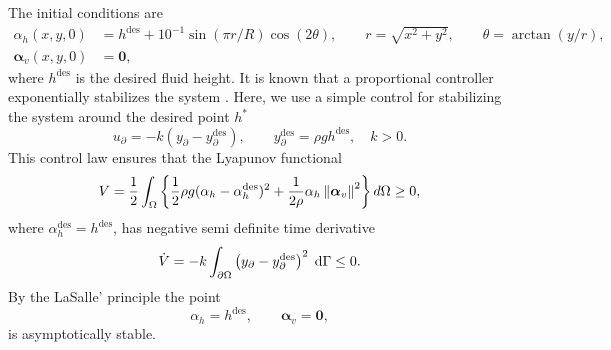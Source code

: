  The initial conditions are
\begin{equation}
\begin{aligned}
\alpha_h(x, y, 0) &= h^{\text{des}} + 10^{-1} \sin(\pi r/R) \cos(2 \theta), \qquad r = \sqrt{x^2 + y^2}, \qquad \theta = \arctan(y/r), \\
\bm\alpha_v(x, y, 0) &= \bm{0},
\end{aligned}
\end{equation}
where $ h^{\text{des}}$ is the desired fluid height. It is known that a proportional controller exponentially stabilizes the system \cite{dos2008boundary}. Here, we use a simple control for stabilizing the system around the desired point $h^*$
\begin{equation}\label{eq:ctrllaw_SWE}
u_\partial = -k (y_\partial - y_\partial^{\text{des}}), \qquad y_\partial^{\text{des}}= \rho g h^{\text{des}}, \quad k>0.
\end{equation}
This control law ensures that the Lyapunov functional
\begin{equation}
	V = \frac{1}{2} \int_{\Omega}\left\{\frac{1}{2} \rho g (\alpha_h - \alpha_h^{\text{des}})^2 + \frac{1}{2\rho} \alpha_h \left\|\bm{\alpha}_v\right\|^2 \right\} d\Omega \ge 0,
\end{equation}
where $\alpha_h^{\text{des}}=h^{\text{des}}$, has negative semi definite time derivative
\begin{equation}
	\dot{V} = -k \int_{\partial \Omega}\left({y}_\partial - {y}_\partial^{\text{des}} \right)^2 \d{\Gamma} \le 0.
\end{equation}
By the LaSalle' principle \cite{henry2006geometric} the point 
\begin{equation}
	\alpha_h = h^{\text{des}}, \qquad \bm{\alpha}_v = \bm{0},
\end{equation}
is asymptotically stable. \\

